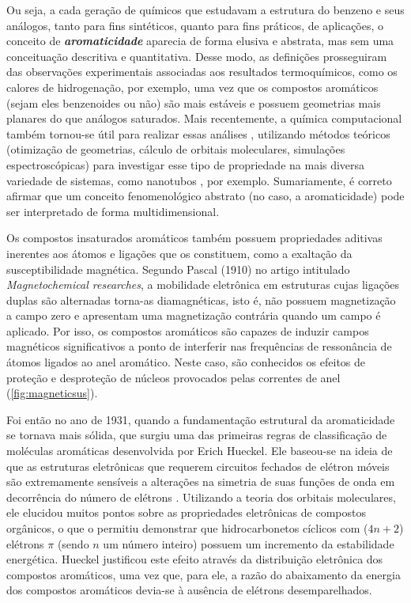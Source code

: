 Ou seja, a cada geração de químicos que estudavam a estrutura do benzeno e seus análogos, tanto para fins sintéticos, quanto para fins práticos, de aplicações, o conceito de \textbf{\textit{aromaticidade}} aparecia de forma elusiva e abstrata, mas sem uma conceituação descritiva e quantitativa. Desse modo, as definições prosseguiram das observações experimentais associadas aos resultados termoquímicos, como os calores de hidrogenação, por exemplo, uma vez que os compostos aromáticos (sejam eles benzenoides ou não) são mais estáveis e possuem geometrias mais planares do que análogos saturados. Mais recentemente, a química computacional também tornou-se útil para realizar essas análises \autocite{Jiao1997}, utilizando métodos teóricos (otimização de geometrias, cálculo de orbitais moleculares, simulações espectroscópicas) para investigar esse tipo de propriedade na mais diversa variedade de sistemas, como nanotubos \autocite{Matsuo2003}, por exemplo. Sumariamente, é correto afirmar que um conceito fenomenológico abstrato (no caso, a aromaticidade) pode ser interpretado de forma multidimensional.

Os compostos insaturados aromáticos também possuem propriedades aditivas inerentes aos átomos e ligações que os constituem, como a exaltação da susceptibilidade magnética\autocite{Schleyer1996, Schleyer2001, Schleyer2014}. Segundo Pascal (1910) no artigo intitulado \textit{Magnetochemical researches}\autocite{pascal1910magnetochemical}, a mobilidade eletrônica em estruturas cujas ligações duplas são alternadas torna-as diamagnéticas, isto é, não possuem magnetização a campo zero e apresentam uma magnetização contrária quando um campo é aplicado. Por isso, os compostos aromáticos são capazes de induzir campos magnéticos significativos a ponto de interferir nas frequências de ressonância de átomos ligados ao anel aromático. Neste caso, são conhecidos os efeitos de proteção e desproteção de núcleos provocados pelas correntes de anel (\autoref{fig:magneticsus}).

Foi então no ano de 1931, quando a fundamentação estrutural da aromaticidade se tornava mais sólida, que surgiu uma das primeiras regras de classificação de moléculas aromáticas desenvolvida por Erich Hueckel\autocite{Hckel1931}. Ele baseou-se na ideia de que as estruturas eletrônicas que requerem circuitos fechados de elétron móveis são extremamente sensíveis a alterações na simetria de suas funções de onda em decorrência do número de elétrons \autocite{Hckel1931, Schleyer1996, Schleyer2001}. Utilizando a teoria dos orbitais moleculares, ele elucidou muitos pontos sobre as propriedades eletrônicas de compostos orgânicos, o que o permitiu demonstrar que hidrocarbonetos cíclicos com ($4n+2$) elétrons $\pi$ (sendo $n$ um número inteiro) possuem um incremento da estabilidade energética. Hueckel\autocite{Hckel1931, Brogli1972} justificou este efeito através da distribuição eletrônica dos compostos aromáticos, uma vez que, para ele, a razão do abaixamento da energia dos compostos aromáticos devia-se à ausência de elétrons desemparelhados.

